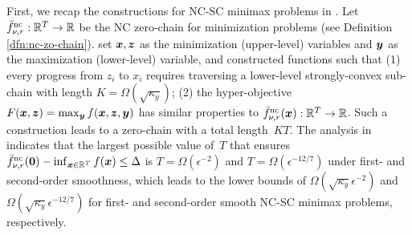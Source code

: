 \documentclass{article}
\begin{document}
First, we recap the constructions for NC-SC minimax problems in \citep{li2021complexity,wang2024efficient}.
Let $\bar f_{\nu, r}^{\rm nc}: {\mathbb{R}}^T \rightarrow {\mathbb{R}}$ be the NC zero-chain \citep{carmon2021lower} for minimization problems (see Definition \ref{dfn:nc-zo-chain}).
\citet{li2021complexity} set
${\bm{x}},{\bm{z}}$ as the minimization (upper-level) variables and ${\bm{y}}$ as the maximization (lower-level) variable, and constructed functions such that 
(1) every progress from $z_i$ to $x_i$ 
requires traversing a lower-level strongly-convex sub-chain with length $K=\Omega(\sqrt{\kappa_y})$; (2) 
the hyper-objective $F({\bm{x}},{\bm{z}})= \max_{{\bm{y}}} f({\bm{x}},{\bm{z}},{\bm{y}})$ has similar
properties to $\bar f^{\rm nc}_{\nu, r}({\bm{x}}): {\mathbb{R}}^T \rightarrow {\mathbb{R}}$. 
Such a construction leads to a zero-chain with a total length~$KT$.
The analysis in \citep{carmon2021lower} indicates that the largest possible value of~$T$ that ensures $\bar f_{\nu,r}^{\rm nc}({\bm{0}}) - \inf_{{\bm{x}} \in {\mathbb{R}}^T} f({\bm{x}}) \le \Delta$ is 
$T = \Omega(\epsilon^{-2})$ and $T = \Omega(\epsilon^{-12/7})$ under first- and second-order smoothness, which leads to the lower bounds of
$\Omega(\sqrt{\kappa_y} \epsilon^{-2})$ \citep{li2021complexity} and $\Omega(\sqrt{\kappa_y} \epsilon^{-12/7})$ \citep{wang2024efficient} for first- and second-order smooth NC-SC minimax problems, respectively.


\end{document}
